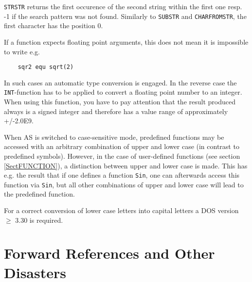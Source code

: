 \documentclass[12pt,twoside]{report}
\newcommand{\tty}[1]{{\tt #1}}
\begin{document}
\tty{STRSTR} returns the first occurence of the second string
within the first one resp. -1 if the search pattern was not found.
Similarly to \tty{SUBSTR} and  \tty{CHARFROMSTR}, the first character
has the position 0.

If a function expects floating point arguments, this does not mean it
is impossible to write e.g.
\begin{verbatim}
    sqr2 equ sqrt(2)
\end{verbatim}
In such cases an automatic type conversion is engaged. In the reverse
case the \tty{INT}-function has to be applied to convert a floating point
number to an integer.  When using this function, you have to pay
attention that the result produced always is a signed integer and
therefore has a value range of approximately +/-2.0E9.

When AS is switched to case-sensitive mode, predefined functions may be
accessed with an arbitrary combination of upper and lower case (in
contrast to predefined symbols).  However, in the case of user-defined
functions (see section \ref{SectFUNCTION}), a distinction between upper
and lower case is made.  This has e.g. the result that if one defines a
function \tty{Sin}, one can afterwards access this function via \tty{Sin}, but all
other combinations of upper and lower case will lead to the predefined
function.

For a correct conversion  of lower case letters
into capital letters a DOS version $\geq$ 3.30 is required.


\section{Forward References and Other Disasters}
\label{ForwRefs}
\end{document}
